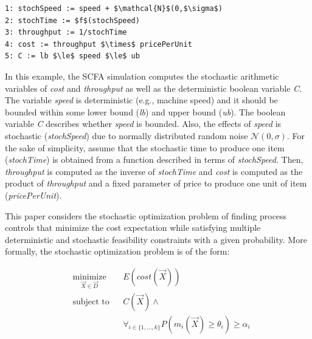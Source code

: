 \documentclass[a4paper, 12pt]{article} %
\begin{document}
\begin{lstlisting}
1: stochSpeed := speed + $\mathcal{N}$(0,$\sigma$)
2: stochTime := $f$(stochSpeed)
3: throughput := 1/stochTime
4: cost := throughput $\times$ pricePerUnit
5: C := lb $\le$ speed $\le$ ub
\end{lstlisting}
In this example, the SCFA simulation computes the stochastic arithmetic variables of \textit{cost} and \textit{throughput} as well as the deterministic boolean variable \textit{C}.
The variable \textit{speed} is deterministic (e.g., machine speed) and it should be bounded within some lower bound (\textit{lb}) and upper bound (\textit{ub}).
The boolean variable \textit{C} describes whether \textit{speed} is bounded.
Also, the effects of \textit{speed} is stochastic (\textit{stochSpeed}) due to normally distributed random noise $\mathcal{N}(0,\sigma)$. 
For the sake of simplicity, assume that the stochastic time to produce one item (\textit{stochTime}) is obtained from a function described in terms of \textit{stochSpeed}.
Then, \textit{throughput} is computed as the inverse of \textit{stochTime} and \textit{cost} is computed as the product of \textit{throughput} and a fixed parameter of price to produce one unit of item (\textit{pricePerUnit}).

This paper considers the stochastic optimization problem of finding process controls that minimize the cost expectation while satisfying multiple deterministic and stochastic feasibility constraints with a given probability.
More formally, the stochastic optimization problem is of the form:

\begin{equation}
\label{eq:stochProb}
\begin{aligned}
& \underset{\vec{X}\in\vec{D}}{\text{minimize}}
& & E(\textit{cost}(\vec{X})) \\
& \text{subject to}
& & C(\vec{X}) \wedge \\
&&& \forall_{i\in\{1,\dots,k\}}P(m_i(\vec{X}) \ge \theta_i) \ge \alpha_i
\end{aligned}
\end{equation}

\end{document}
